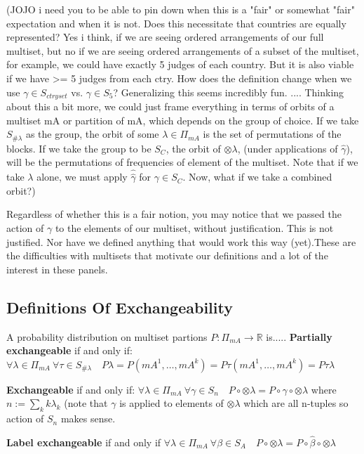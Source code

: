 \documentclass{article}
\theoremstyle{definition}
\begin{document}
(JOJO i need you to be able to pin down when this is a "fair" or somewhat "fair" expectation and when it is not. Does this necessitate that countries are equally represented? Yes i think, if we are seeing ordered arrangements of our full multiset, but no if we are seeing ordered arrangements of a subset of the multiset, for example, we could have exactly 5 judges of each country. But it is also viable if we have >= 5 judges from each ctry. How does the definition change when we use $\gamma\in S_{ctry set}$ vs. $\gamma\in S_5$? Generalizing this seems incredibly fun.   .... Thinking about this a bit more, we could just frame everything in terms of orbits of a multiset mA or partition of mA, which depends on the group of choice. If we take $S_{\#\lambda}$ as the group, the orbit of some $\lambda \in \Pi_{mA}$ is the set of permutations of the blocks. If we take the group to be $S_C$, the orbit of $\otimes\lambda$, (under applications of $\hat{\gamma}$), will be the permutations of frequencies of element of the multiset. Note that if we take $\lambda$ alone, we must apply $\hat{\hat{\gamma}}$ for $\gamma \in S_C$. Now, what if we take a combined orbit?)

Regardless of whether this is a fair notion, you may notice that we passed the action of $\gamma $ to the elements of our multiset, without justification. This is not justified. Nor have we defined anything that would work this way (yet).These are the difficulties with multisets that motivate our definitions and a lot of the interest in these panels.

\subsection{Definitions Of Exchangeability}
A probability distribution on multiset partions $P: \Pi_{mA}\rightarrow \mathbb{R}$ is.....
\textbf{Partially exchangeable} if and only if: 	$\forall \lambda \in \Pi_{mA}\:  \forall\tau\in S_{\#\lambda} \quad P\lambda = P(mA^1,…,mA^k)= P\tau(mA^1,…,mA^k)= P\tau\lambda $

\textbf{Exchangeable} if and only if:
$\forall \lambda \in \Pi_{mA}\:\forall \gamma\in S_n\quad P\circ\otimes\lambda=P\circ\gamma\circ\otimes\lambda $ where $n:=\sum_k k\lambda_k$ (note that $\gamma$ is applied to elements of $\otimes\lambda$ which are all n-tuples so action of $S_n$ makes sense.

\textbf{Label exchangeable} if and only if $\forall \lambda \in \Pi_{mA} \: \forall \beta \in S_A \quad P\circ\otimes\lambda = P\circ\hat{\beta}\circ\otimes\lambda$ 
\end{document}
